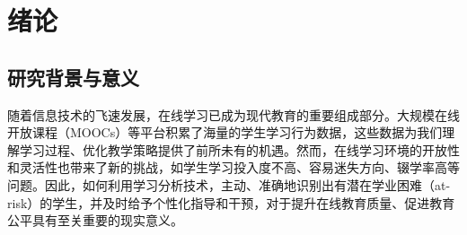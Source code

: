 \documentclass{SYSUReport}
\date{\today}
\begin{document}
\cover
\thispagestyle{empty} %
\clearpage

\begin{abstract}
随着在线教育的普及，如何利用海量学习行为数据，提前识别并干预有潜在学业困难的学生，已成为教育数据挖掘领域的重要课题。本项目旨在基于OULAD (Open University Learning Analytics Dataset) 数据集，设计并实现一个模块化的学业风险预警系统，并对多种机器学习模型的性能进行综合评估。

本项目首先构建了一个健壮的数据处理流水线，包括ETL、数据清洗、特征工程和探索性数据分析(EDA)。在此基础上，我们实现并对比了七种主流的机器学习模型，涵盖监督学习（逻辑回归、决策树、随机森林、支持向量机）和无监督学习（K-Means、高斯混合模型EM）。为了追求模型的最优性能，我们引入了Optuna框架进行自动化超参数优化，并利用SHAP (SHapley Additive exPlanations)框架对模型进行深度可解释性分析。

本项目不仅实现了一个端到端的学业风险预测系统，还从准确性、效率、可解释性、复杂度等多个维度，建立了一套完整、公正的模型评估与比较框架。研究成果可为在线教育平台实施个性化干预、提升教学质量提供数据驱动的决策支持。

\textbf{关键字}：学业风险预警；机器学习；OULAD；模型对比；Optuna；SHAP
\end{abstract}
\thispagestyle{empty} %
\clearpage


\setcounter{page}{1}
\tableofcontents
\clearpage

\setcounter{page}{1}

\section{绪论}
\subsection{研究背景与意义}
随着信息技术的飞速发展，在线学习已成为现代教育的重要组成部分。大规模在线开放课程（MOOCs）等平台积累了海量的学生学习行为数据，这些数据为我们理解学习过程、优化教学策略提供了前所未有的机遇。然而，在线学习环境的开放性和灵活性也带来了新的挑战，如学生学习投入度不高、容易迷失方向、辍学率高等问题。因此，如何利用学习分析技术，主动、准确地识别出有潜在学业困难（at-risk）的学生，并及时给予个性化指导和干预，对于提升在线教育质量、促进教育公平具有至关重要的现实意义。
\end{document}
